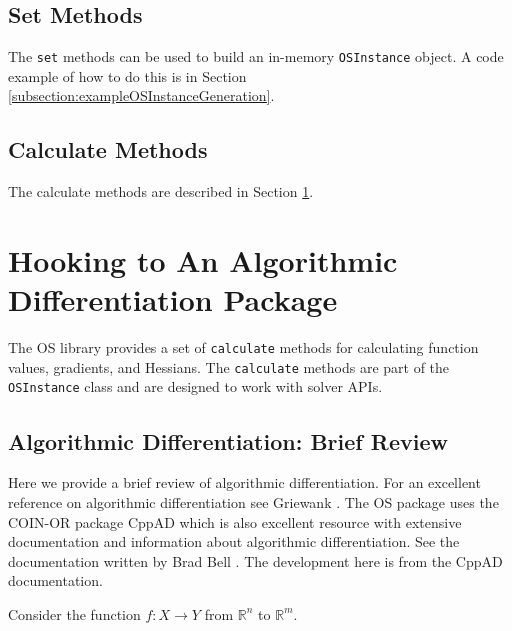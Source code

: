 \documentclass[11pt]{article}
\renewcommand{\_}{{\char"5F}}
\renewcommand{\{}{{\char"7B}}
\renewcommand{\}}{{\char"7D}}
\renewcommand{\^}{{\char"0D}}
\renewcommand{\'}{{\char"0D}}
\begin{document}
\subsection{Set Methods}

The {\tt set} methods can be used to build an in-memory {\tt OSInstance}
 object. A code example of how to do this is in Section \ref{subsection:exampleOSInstanceGeneration}. 

\subsection{Calculate Methods}

The calculate methods are described in Section \ref{section:ad}.

\section{Hooking to An Algorithmic Differentiation Package}\label{section:ad}

The OS library provides a set of {\tt calculate} methods for calculating  function values, gradients, and Hessians.     The {\tt calculate} methods are part of the {\tt OSInstance} class and are designed to work with solver APIs.



\subsection{Algorithmic Differentiation:  Brief Review}\label{section:adtheory}

Here we provide a brief review of algorithmic differentiation.  For an excellent reference on algorithmic differentiation see Griewank \cite{griewank2000}.  The OS package uses the COIN-OR package CppAD which  is also excellent resource with extensive  documentation and information about algorithmic differentiation. See the documentation written by  Brad Bell \cite{bell2007}.    The development here is from the CppAD documentation. 

Consider the function $f:X \rightarrow Y$ from $ \mathbb{R}^{n}$ to $ \mathbb{R}^{m}.$ 
\end{document}
